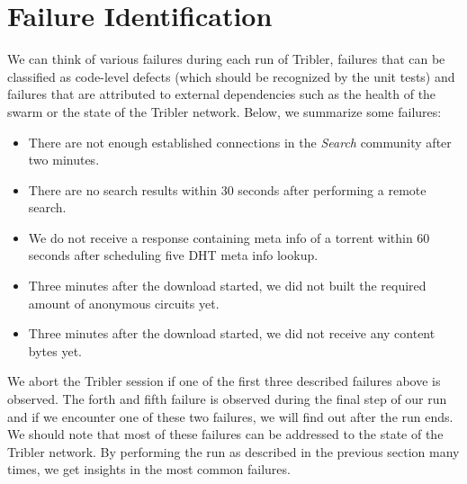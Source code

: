 \section{Failure Identification}
We can think of various failures during each run of Tribler, failures that can be classified as code-level defects (which should be recognized by the unit tests) and failures that are attributed to external dependencies such as the health of the swarm or the state of the Tribler network. Below, we summarize some failures:
\begin{itemize}
	\item There are not enough established connections in the \emph{Search} community after two minutes.
	\item There are no search results within 30 seconds after performing a remote search.
	\item We do not receive a response containing meta info of a torrent within 60 seconds after scheduling five DHT meta info lookup.
	\item Three minutes after the download started, we did not built the required amount of anonymous circuits yet.
	\item Three minutes after the download started, we did not receive any content bytes yet.
\end{itemize}
We abort the Tribler session if one of the first three described failures above is observed. The forth and fifth failure is observed during the final step of our run and if we encounter one of these two failures, we will find out after the run ends. We should note that most of these failures can be addressed to the state of the Tribler network. By performing the run as described in the previous section many times, we get insights in the most common failures.



